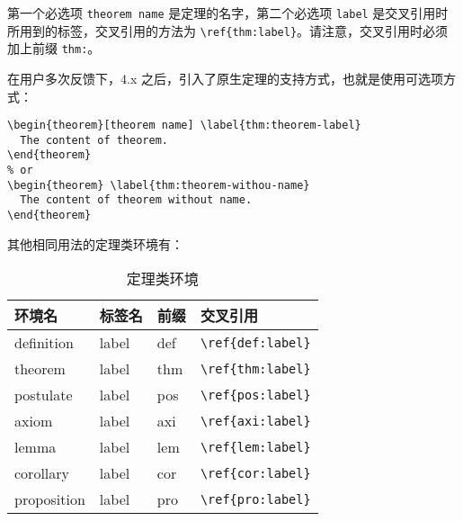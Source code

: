 \documentclass[lang=cn,10pt]{elegantbook}
\begin{document}
第一个必选项 \lstinline{theorem name} 是定理的名字，第二个必选项 \lstinline{label} 是交叉引用时所用到的标签，交叉引用的方法为 \verb|\ref{thm:label}|。请注意，交叉引用时必须加上前缀 \lstinline{thm:}。

在用户多次反馈下，4.x 之后，引入了原生定理的支持方式，也就是使用可选项方式：

\begin{lstlisting}
\begin{theorem}[theorem name] \label{thm:theorem-label}
  The content of theorem.
\end{theorem}
% or 
\begin{theorem} \label{thm:theorem-withou-name}
  The content of theorem without name.
\end{theorem}
\end{lstlisting}

其他相同用法的定理类环境有：

\begin{table}[htbp]
   \centering
   \caption{定理类环境}
     \begin{tabular}{llll}
     \toprule
     环境名 & 标签名 & 前缀 & 交叉引用 \\
     \midrule
     definition & label & def   & \lstinline|\ref{def:label}| \\
     theorem & label & thm   & \lstinline|\ref{thm:label}| \\
     postulate & label & pos & \lstinline|\ref{pos:label}| \\
     axiom & label & axi & \lstinline|\ref{axi:label}|\\
     lemma & label & lem   & \lstinline|\ref{lem:label}| \\
     corollary & label & cor   & \lstinline|\ref{cor:label}| \\
     proposition & label & pro   & \lstinline|\ref{pro:label}| \\
     \bottomrule
     \end{tabular}%
   \label{tab:theorem-class}%
 \end{table}%
 
\end{document}
